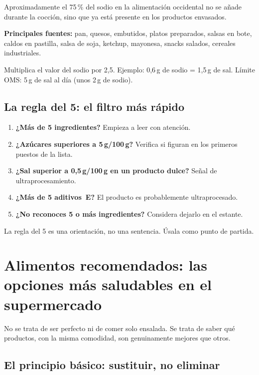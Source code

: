 \documentclass[a5paper,12pt,oneside,openany]{book}
\newcommand{\boxinfo}[2]{%
  \begin{tcolorbox}[cajabase,
    colback=azulinfo!8!white, colframe=azulinfo, title={#1}]
  #2\end{tcolorbox}}
\begin{document}
Aproximadamente el 75\,\% del sodio en la alimentación occidental no se añade
durante la cocción, sino que ya está presente en los productos envasados.

\textbf{Principales fuentes:} pan, quesos, embutidos, platos preparados, salsas
en bote, caldos en pastilla, salsa de soja, ketchup, mayonesa, snacks salados,
cereales industriales.

\boxinfo{Cómo convertir sodio en sal en la etiqueta}{Multiplica el valor del
sodio por 2,5. Ejemplo: 0,6\,g de sodio = 1,5\,g de sal. Límite OMS: 5\,g
de sal al día (unos 2\,g de sodio).}

\section{La regla del 5: el filtro más rápido}

\begin{enumerate}
  \item \textbf{¿Más de 5 ingredientes?} Empieza a leer con atención.
  \item \textbf{¿Azúcares superiores a 5\,g/100\,g?} Verifica si figuran en
    los primeros puestos de la lista.
  \item \textbf{¿Sal superior a 0,5\,g/100\,g en un producto dulce?} Señal
    de ultraprocesamiento.
  \item \textbf{¿Más de 5 aditivos~E?} El producto es probablemente
    ultraprocesado.
  \item \textbf{¿No reconoces 5 o más ingredientes?} Considera dejarlo en el
    estante.
\end{enumerate}

\boxinfo{Nota}{La regla del 5 es una orientación, no una sentencia.
Úsala como punto de partida.}

\chapter{Alimentos recomendados: las opciones más saludables en el supermercado}

No se trata de ser perfecto ni de comer solo ensalada. Se trata de saber qué
productos, con la misma comodidad, son genuinamente mejores que otros.

\section{El principio básico: sustituir, no eliminar}
\end{document}
